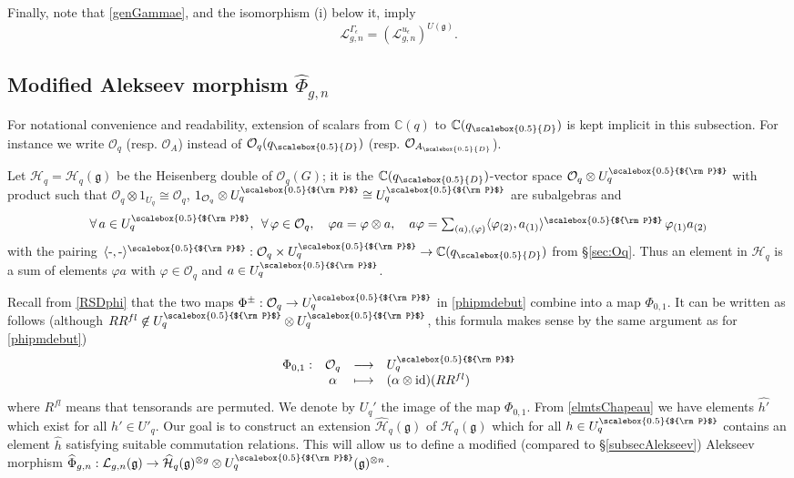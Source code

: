 \documentclass[11pt]{amsart}
\newcommand{\fonc}[5]{                     %
            \begin{array}{rcll}#1 :& #2 & \longrightarrow & #3 \\   %
                         &#4 &\longmapsto & #5          %
            \end{array}}
\newcommand{\e}{\epsilon}
\newcommand{\Oo}{\mathcal{O}}
\newcommand{\qD}{q_{\scalebox{0.5}{D}}}
\newcommand{\AD}{A_{\scalebox{0.5}{D}}}
\newcommand{\Pup}{{\scalebox{0.5}{${\rm P}$}}}
\begin{document}
Finally, note that \eqref{genGammae}, and the isomorphism (i) below it, imply
\begin{equation}\label{factoraction}
\mathcal{L}_{g,n}^{\Gamma_\e} = (\mathcal{L}_{g,n}^{u_\e})^{U(\mathfrak{g})}.
\end{equation}
\subsection{Modified Alekseev morphism \texorpdfstring{$\widehat{\Phi}_{g,n}$}{ }}\label{subsecModifiedAlekseev}
For notational convenience and readability, extension of scalars from $\mathbb{C}(q)$ to $\mathbb{C}(\qD)$ is kept implicit in this subsection. For instance we write $\mathcal{O}_q$ (resp. $\mathcal{O}_A$) instead of $\mathcal{O}_q(\qD)$ (resp. $\mathcal{O}_{\AD}$).

\smallskip

\indent Let $\mathcal{H}_q = \mathcal{H}_q(\mathfrak{g})$ be the Heisenberg double of $\mathcal{O}_q(G)$; it is the $\mathbb{C}(\qD)$-vector space $\mathcal{O}_q \otimes U_q^\Pup$ with product such that $\mathcal{O}_q \otimes 1_{U_q} \cong \mathcal{O}_q$, $1_{\mathcal{O}_q} \otimes U^\Pup_q \cong U_q^\Pup$ are subalgebras and
\begin{equation}\label{relationEchangeHq}
\textstyle  \forall \, a \in U_q^\Pup, \:\: \forall \, \varphi \in \mathcal{O}_q, \quad \varphi a = \varphi \otimes a, \quad a\varphi = \sum_{(a),(\varphi)} \langle \varphi_{(2)}, a_{(1)} \rangle^\Pup \, \varphi_{(1)}a_{(2)}
\end{equation}
with the pairing $\langle\text{-},\text{-}\rangle^\Pup : \mathcal{O}_q \times U_q^\Pup \to \mathbb{C}(\qD)$ from \S\ref{sec:Oq}. Thus an element in $\mathcal{H}_q$ is a sum of elements $\varphi a$ with $\varphi \in \mathcal{O}_q$ and $a \in U_q^\Pup$.

\smallskip

Recall from \eqref{RSDphi} that the two maps $\Phi^\pm : \mathcal{O}_q \to U_q^\Pup$ in \eqref{phipmdebut} combine into a map $\Phi_{0,1}$. It can be written as follows (although $RR^{fl} \not\in U_q^\Pup \otimes U_q^\Pup$, this formula makes sense by the same argument as for \eqref{phipmdebut})
\begin{equation}\label{defPhi01janv25}
\fonc{\Phi_{0,1}}{\Oo_q}{U_q^\Pup}{\alpha}{(\alpha\otimes \mathrm{id})(RR^{fl})}
\end{equation}
where $R^{fl}$ means that tensorands are permuted. We denote by $U_q'$ the image of the map $\Phi_{0,1}$. From \eqref{elmtsChapeau} we have elements $\widehat{h'}$ which exist for all $h' \in U'_q$. Our goal is to construct an extension $\widehat{\mathcal{H}}_q(\mathfrak{g})$ of $\mathcal{H}_q(\mathfrak{g})$ which for all $h \in U_q^\Pup$ contains an element $\widehat{h}$ satisfying suitable commutation relations. This will allow us to define a modified (compared to \S\ref{subsecAlekseev}) Alekseev morphism $\widehat{\Phi}_{g,n} : \mathcal{L}_{g,n}(\mathfrak{g}) \to \widehat{\mathcal{H}}_q(\mathfrak{g})^{\otimes g} \otimes U_q^\Pup(\mathfrak{g})^{\otimes n}$.
\end{document}
